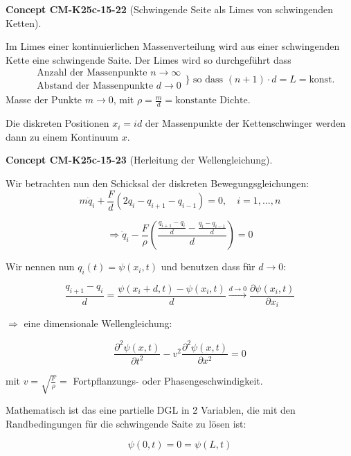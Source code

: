 \documentclass[10pt, letterpaper]{article}
\newcommand{\CustomHeading}[3]{%
  \par\medskip\noindent%
  \textbf{#1 #2} \textnormal{(#3)}.\enskip%
}
\newenvironment{CONC}[2]{\CustomHeading{Concept}{#1}{#2}}{}
\begin{document}
\begin{CONC}{CM-K25c-15-22}{Schwingende Seite als Limes von schwingenden Ketten}
Im Limes einer kontinuierlichen Massenverteilung wird aus einer schwingenden Kette eine schwingende Saite. Der Limes wird so durchgeführt dass
\[
\begin{aligned}
&\text{Anzahl der Massenpunkte } n \to \infty \\
&\text{Abstand der Massenpunkte } d \to 0 
\end{aligned}
\} \text{ so dass } (n+1)\cdot d = L = \text{konst.}
\]
Masse der Punkte $m \to 0$, mit $\rho = \frac{m}{d} = \text{konstante Dichte}$.

Die diskreten Positionen $x_i = id$ der Massenpunkte der Kettenschwinger werden dann zu einem Kontinuum $x$.
\end{CONC}

\begin{CONC}{CM-K25c-15-23}{Herleitung der Wellengleichung}
Wir betrachten nun den Schicksal der diskreten Bewegungsgleichungen:
\[
m\ddot{q}_i + \frac{F}{d}(2q_i - q_{i+1} - q_{i-1}) = 0, \quad i=1,...,n
\]

\[
\Rightarrow \ddot{q}_i - \frac{F}{\rho}\left(\frac{\frac{q_{i+1}-q_i}{d} - \frac{q_i-q_{i-1}}{d}}{d}\right) = 0
\]

Wir nennen nun $q_i(t) = \psi(x_i,t)$ und benutzen dass für $d \to 0$:

\[
\frac{q_{i+1}-q_i}{d} = \frac{\psi(x_i+d,t) - \psi(x_i,t)}{d} \xrightarrow{d\to 0} \frac{\partial\psi(x_i,t)}{\partial x_i}
\]

$\Rightarrow$ eine dimensionale Wellengleichung:

\[
\frac{\partial^2\psi(x,t)}{\partial t^2} - v^2\frac{\partial^2\psi(x,t)}{\partial x^2} = 0
\]

mit $v = \sqrt{\frac{F}{\rho}} = $ Fortpflanzungs- oder Phasengeschwindigkeit.

Mathematisch ist das eine partielle DGL in 2 Variablen, die mit den Randbedingungen für die schwingende Saite zu lösen ist:

\[
\psi(0,t) = 0 = \psi(L,t)
\]
\end{CONC}
\end{document}
